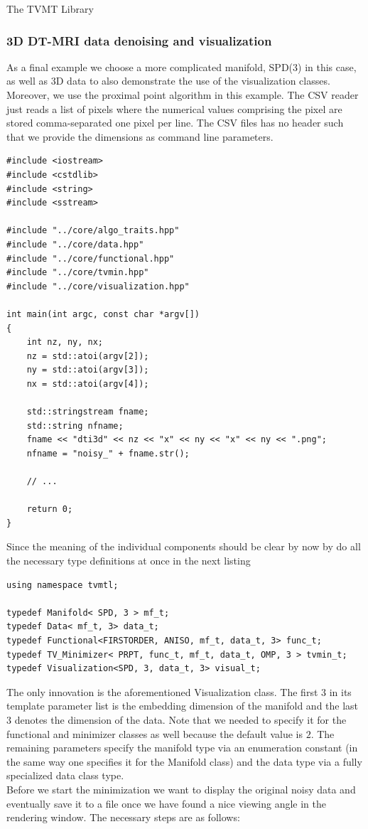 \begin{chapter}{The TVMT Library}
\subsubsection{3D DT-MRI data denoising and visualization} %
\label{ssub:dti_tut}
As a final example we choose a more complicated manifold, SPD(3) in this case, as well as 3D data to also demonstrate the use of the visualization classes. Moreover, we use
the proximal point algorithm in this example. The CSV reader just reads a list of pixels where the numerical values comprising the pixel are stored comma-separated one pixel
per line. The CSV files has no header such that we provide the dimensions as command line parameters.

\cppinline
\begin{lstlisting}[label=code:tut3_init,caption={Initialization}]
#include <iostream>
#include <cstdlib>
#include <string>
#include <sstream>

#include "../core/algo_traits.hpp"
#include "../core/data.hpp"
#include "../core/functional.hpp"
#include "../core/tvmin.hpp"
#include "../core/visualization.hpp"

int main(int argc, const char *argv[])
{       
    int nz, ny, nx;
    nz = std::atoi(argv[2]);
    ny = std::atoi(argv[3]);
    nx = std::atoi(argv[4]);

    std::stringstream fname;
    std::string nfname;
    fname << "dti3d" << nz << "x" << ny << "x" << ny << ".png";
    nfname = "noisy_" + fname.str();
    
    // ...

    return 0;    
}
\end{lstlisting}
	
Since the meaning of the individual components should be clear by now by do all the necessary type definitions at once in the next listing\\
\cppinline
\begin{lstlisting}[label=code:tut3_typdefinitions,caption={Type definitions, Visualization type}]
using namespace tvmtl;

typedef Manifold< SPD, 3 > mf_t;
typedef Data< mf_t, 3> data_t;
typedef Functional<FIRSTORDER, ANISO, mf_t, data_t, 3> func_t;
typedef TV_Minimizer< PRPT, func_t, mf_t, data_t, OMP, 3 > tvmin_t;
typedef Visualization<SPD, 3, data_t, 3> visual_t;
\end{lstlisting}

The only innovation is the aforementioned Visualization class. The first $3$ in its template parameter list is the embedding dimension of the manifold 
and the last $3$ denotes the dimension of the data. Note that we needed to specify it for the functional and minimizer classes as well because the default value is $2$. 
The remaining parameters specify the manifold type via an enumeration constant (in the same way one specifies it for the Manifold class) and the data type via a fully
specialized data class type.\\
Before we start the minimization we want to display the original noisy data and eventually save it to a file once we have found a nice viewing angle in the rendering window.
The necessary steps are as follows:\\


\end{chapter}
